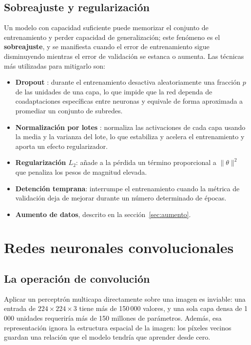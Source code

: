 \subsection{Sobreajuste y regularización}

Un modelo con capacidad suficiente puede memorizar el conjunto de
entrenamiento y perder capacidad de generalización; este fenómeno es el
\textbf{sobreajuste}, y se manifiesta cuando el error de entrenamiento sigue
disminuyendo mientras el error de validación se estanca o aumenta. Las
técnicas más utilizadas para mitigarlo son:

\begin{itemize}
    \item \textbf{Dropout} \citep{srivastava2014}: durante el entrenamiento
    desactiva aleatoriamente una fracción $p$ de las unidades de una capa,
    lo que impide que la red dependa de coadaptaciones específicas entre
    neuronas y equivale de forma aproximada a promediar un conjunto de
    subredes.
    \item \textbf{Normalización por lotes} \citep{ioffe2015}: normaliza las
    activaciones de cada capa usando la media y la varianza del lote, lo que
    estabiliza y acelera el entrenamiento y aporta un efecto regularizador.
    \item \textbf{Regularización $L_{2}$}: añade a la pérdida un término
    proporcional a $\|\theta\|^{2}$ que penaliza los pesos de magnitud
    elevada.
    \item \textbf{Detención temprana}: interrumpe el entrenamiento cuando la
    métrica de validación deja de mejorar durante un número determinado de
    épocas.
    \item \textbf{Aumento de datos}, descrito en la
    sección~\ref{sec:aumento}.
\end{itemize}

\section{Redes neuronales convolucionales}

\subsection{La operación de convolución}

Aplicar un perceptrón multicapa directamente sobre una imagen es inviable:
una entrada de $224 \times 224 \times 3$ tiene más de 150\,000 valores, y
una sola capa densa de 1\,000 unidades requeriría más de 150 millones de
parámetros. Además, esa representación ignora la estructura espacial de la
imagen: los píxeles vecinos guardan una relación que el modelo tendría que
aprender desde cero.

